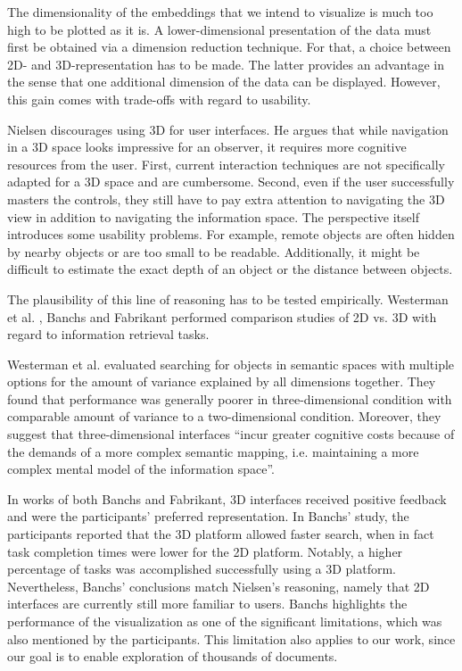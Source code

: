 The dimensionality of the embeddings that we intend to visualize is much too high to be plotted as it is.
A lower-dimensional presentation of the data must first be obtained via a dimension reduction technique. 
For that, a choice between 2D- and 3D-representation has to be made.
The latter provides an advantage in the sense that one additional dimension of the data can be displayed.
However, this gain comes with trade-offs with regard to usability.

Nielsen \cite{Nielsen1998} discourages using 3D for user interfaces.
He argues that while navigation in a 3D space looks impressive for an observer, it requires more cognitive resources from the user.
First, current interaction techniques are not specifically adapted for a 3D space and are cumbersome.
Second, even if the user successfully masters the controls, they still have to pay extra attention to navigating the 3D view in addition to navigating the information space.
The perspective itself introduces some usability problems. 
For example, remote objects are often hidden by nearby objects or are too small to be readable.
Additionally, it might be difficult to estimate the exact depth of an object or the distance between objects.

The plausibility of this line of reasoning has to be tested empirically.
Westerman et al. \cite{Westerman2000}, Banchs \cite{Banchs2014} and Fabrikant \cite{Fabrikant2007} performed comparison studies of 2D vs. 3D with regard to information retrieval tasks. 

Westerman et al. evaluated searching for objects in semantic spaces with multiple options for the amount of variance explained by all dimensions together.
They found that performance was generally poorer in three-dimensional condition with comparable amount of variance to a two-dimensional condition.
Moreover, they suggest that three-dimensional interfaces ``incur greater cognitive costs because of the demands of a more complex semantic mapping, i.e. maintaining a more complex mental model of the information space''.

In works of both Banchs and Fabrikant, 3D interfaces received positive feedback and were the participants' preferred representation.
In Banchs' study, the participants reported that the 3D platform allowed faster search, when in fact task completion times were lower for the 2D platform.
Notably, a higher percentage of tasks was accomplished successfully using a 3D platform.
Nevertheless, Banchs' conclusions match Nielsen's reasoning, namely that 2D interfaces are currently still more familiar to users.
Banchs highlights the performance of the visualization as one of the significant limitations, which was also mentioned by the participants.
This limitation also applies to our work, since our goal is to enable exploration of thousands of documents.

